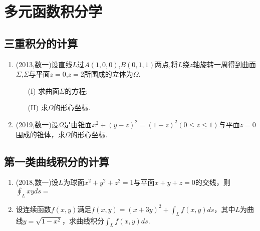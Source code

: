 \documentclass[12pt, a4paper, oneside, UTF8]{ctexbook}
\begin{document}

\else
\fi

\chapter{多元函数积分学}
\section{三重积分的计算}

\begin{enumerate}[label=\arabic*.]
    \item (2013,数一)设直线$L$过$A(1,0,0)$,$B(0,1,1)$两点,将$L$绕$z$轴旋转一周得到曲面$\Sigma$,$\Sigma$与平面$z=0$,$z=2$所围成的立体为$\Omega$.
    \begin{enumerate}
        \item[(I)] 求曲面$\Sigma$的方程;
        \item[(II)] 求$\Omega$的形心坐标.
    \end{enumerate}
    
    \begin{solution}
    \newpage
    \end{solution}
    
    \item (2019,数一)设$\Omega$是由锥面$x^{2}+(y-z)^{2}=(1-z)^{2}(0\leq z\leq 1)$与平面$z=0$围成的锥体，求$\Omega$的形心坐标.
    
    \begin{solution}
    \newpage
    \end{solution}
\end{enumerate}

\section{第一类曲线积分的计算}

\begin{enumerate}[label=\arabic*.,start=3]
    \item (2018,数一)设$L$为球面$x^2+y^2+z^2=1$与平面$x+y+z=0$的交线，则$\oint_L xy ds=$
    
    \begin{solution}
    \newpage
    \end{solution}
    
    \item 设连续函数$f(x,y)$满足$f(x,y)=(x+3y)^2+\int_L f(x,y) ds$，其中$L$为曲线$y=\sqrt{1-x^2}$，求曲线积分$\int_L f(x,y) ds$.
    
    \begin{solution}
    \newpage
    \end{solution}
\end{enumerate}
\end{document}
